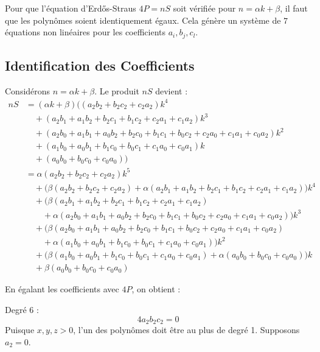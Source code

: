 \documentclass[11pt,a4paper]{article}
\begin{document}
Pour que l'équation d'Erd\H{{o}}s-Straus $4P = nS$ soit vérifiée pour $n = \alpha k + \beta$, il faut que les polynômes soient identiquement égaux.
Cela génère un système de $7$ équations non linéaires pour les coefficients $a_i, b_j, c_l$.

\subsection{Identification des Coefficients}
Considérons $n = \alpha k + \beta$. Le produit $nS$ devient :
\begin{align*}
nS &= (\alpha k + \beta) \Big( (a_2 b_2 + b_2 c_2 + c_2 a_2) k^4 \\
&\quad + (a_2 b_1 + a_1 b_2 + b_2 c_1 + b_1 c_2 + c_2 a_1 + c_1 a_2) k^3 \\
&\quad + (a_2 b_0 + a_1 b_1 + a_0 b_2 + b_2 c_0 + b_1 c_1 + b_0 c_2 + c_2 a_0 + c_1 a_1 + c_0 a_2) k^2 \\
&\quad + (a_1 b_0 + a_0 b_1 + b_1 c_0 + b_0 c_1 + c_1 a_0 + c_0 a_1) k \\
&\quad + (a_0 b_0 + b_0 c_0 + c_0 a_0) \Big) \\
&= \alpha(a_2 b_2 + b_2 c_2 + c_2 a_2) k^5 \\
&\quad + \Big( \beta(a_2 b_2 + b_2 c_2 + c_2 a_2) + \alpha(a_2 b_1 + a_1 b_2 + b_2 c_1 + b_1 c_2 + c_2 a_1 + c_1 a_2) \Big) k^4 \\
&\quad + \Big( \beta(a_2 b_1 + a_1 b_2 + b_2 c_1 + b_1 c_2 + c_2 a_1 + c_1 a_2) \\
&\quad \quad + \alpha(a_2 b_0 + a_1 b_1 + a_0 b_2 + b_2 c_0 + b_1 c_1 + b_0 c_2 + c_2 a_0 + c_1 a_1 + c_0 a_2) \Big) k^3 \\
&\quad + \Big( \beta(a_2 b_0 + a_1 b_1 + a_0 b_2 + b_2 c_0 + b_1 c_1 + b_0 c_2 + c_2 a_0 + c_1 a_1 + c_0 a_2) \\
&\quad \quad + \alpha(a_1 b_0 + a_0 b_1 + b_1 c_0 + b_0 c_1 + c_1 a_0 + c_0 a_1) \Big) k^2 \\
&\quad + \Big( \beta(a_1 b_0 + a_0 b_1 + b_1 c_0 + b_0 c_1 + c_1 a_0 + c_0 a_1) + \alpha(a_0 b_0 + b_0 c_0 + c_0 a_0) \Big) k \\
&\quad + \beta(a_0 b_0 + b_0 c_0 + c_0 a_0)
\end{align*}

En égalant les coefficients avec $4P$, on obtient :

Degré 6 :
\begin{equation}
4 a_2 b_2 c_2 = 0
\end{equation}
Puisque $x, y, z > 0$, l'un des polynômes doit être au plus de degré 1. Supposons $a_2 = 0$.
\end{document}
